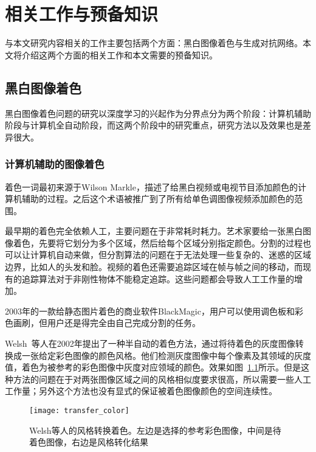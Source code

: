 \chapter{相关工作与预备知识}
\label{cha:2-related}

  与本文研究内容相关的工作主要包括两个方面：黑白图像着色与生成对抗网络。本文将介绍这两个方面的相关工作和本文需要的预备知识。

\section{黑白图像着色}
\label{sec:2-image-color}

  黑白图像着色问题的研究以深度学习的兴起作为分界点分为两个阶段：计算机辅助阶段与计算机全自动阶段，而这两个阶段中的研究重点，研究方法以及效果也是差异很大。

\subsection{计算机辅助的图像着色}
\label{sec:2-user-guided-color}
  
  着色一词最初来源于Wilson Markle，描述了给黑白视频或电视节目添加颜色的计算机辅助的过程。之后这个术语被推广到了所有给单色调图像视频添加颜色的范围。

  最早期的着色完全依赖人工，主要问题在于非常耗时耗力。艺术家要给一张黑白图像着色，先要将它划分为多个区域，然后给每个区域分别指定颜色。分割的过程也可以让计算机自动来做，但分割算法的问题在于无法处理一些复杂的、迷惑的区域边界，比如人的头发和脸。视频的着色还需要追踪区域在帧与帧之间的移动，而现有的追踪算法对于非刚性物体不能稳定追踪。这些问题都会导致人工工作量的增加。

  2003年的一款给静态图片着色的商业软件BlackMagic，用户可以使用调色板和彩色画刷，但用户还是得完全由自己完成分割的任务。

  Welsh~\cite{DBLP:journals/tog/WelshAM02}等人在2002年提出了一种半自动的着色方法，通过将待着色的灰度图像转换成一张给定彩色图像的颜色风格。他们检测灰度图像中每个像素及其领域的灰度值，着色为被参考的彩色图像中灰度对应领域的颜色。效果如图~\ref{fig:transfer}所示。但是这种方法的问题在于对两张图像区域之间的风格相似度要求很高，所以需要一些人工工作量；另外这个方法也没有显式的保证被着色图像颜色的空间连续性。

  \begin{figure}[H]
    \centering
    \texttt{[image: transfer\_color]}
    \caption[Welsh等人的风格转换着色]{Welsh等人的风格转换着色。左边是选择的参考彩色图像，中间是待着色图像，右边是风格转化结果}
    \label{fig:transfer}
  \end{figure}

